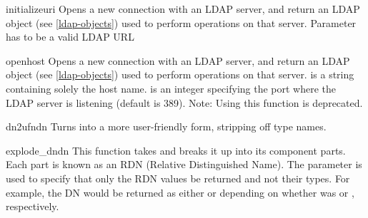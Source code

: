 
\begin{funcdesc}{initialize}{uri} %
  Opens a new connection with an LDAP server, and return an LDAP object
  (see \ref{ldap-objects}) used to perform operations on that server.
  Parameter  has to be a valid LDAP URL
  \begin{seealso}
  \end{seealso}
\end{funcdesc}

\begin{funcdesc}{open}{host } %
  Opens a new connection with an LDAP server, and return an LDAP object
  (see \ref{ldap-objects}) used to perform operations on that server.
   is a string containing solely the host name. 
  is an integer specifying the port where the LDAP server is
  listening (default is 389).
  Note: Using this function is deprecated.
\end{funcdesc}

\begin{funcdesc}{dn2ufn}{dn} %
  Turns  into a more user-friendly form, stripping off type names.
  \begin{seealso}
  \end{seealso}
\end{funcdesc}

\begin{funcdesc}{explode_dn}{dn } %
  This function takes  and breaks it up into its component parts. 
  Each part is known as an RDN (Relative Distinguished Name). The
   parameter is used to specify that only the RDN values be 
  returned and not their types.
  For example, the DN  would be
  returned as either \code{["cn=Bob", "c=US"]} or \code{["Bob","US"]}
  depending on whether  was  or ,
  respectively.
  \begin{seealso}
  \end{seealso}
\end{funcdesc}

